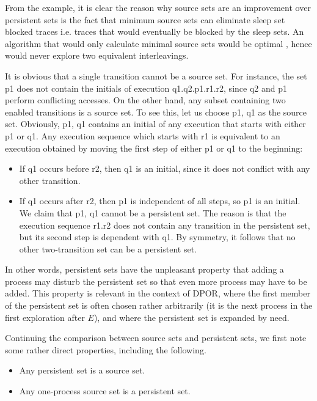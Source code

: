 From the example, it is clear the reason why source sets are an improvement over persistent sets is the fact that minimum source sets can eliminate
sleep set blocked traces i.e. traces that would eventually be blocked by the sleep sets. An algorithm that would only calculate minimal source sets would be optimal \cite{AbdullaAronisJohnssonSagonasDPOR2014}, hence
would never explore two equivalent interleavings.

It is obvious that a single transition cannot be a source set. For
instance, the set {p1} does not contain the initials of execution q1.q2.p1.r1.r2,
since q2 and p1 perform conflicting accesses. On the other hand, any subset
containing two enabled transitions is a source set. To see this, let us choose
{p1, q1} as the source set. Obviously, {p1, q1} contains an initial of any execution
that starts with either p1 or q1. Any execution sequence which starts with r1 is
equivalent to an execution obtained by moving the first step of either p1 or q1 to
the beginning:
\begin{itemize}
\item If q1 occurs before r2, then q1 is an initial, since it does not conflict with
any other transition.
\item If q1 occurs after r2, then p1 is independent of all steps, so p1 is an initial.
We claim that {p1, q1} cannot be a persistent set. The reason is that the execution
sequence r1.r2 does not contain any transition in the persistent set, but its second
step is dependent with q1. By symmetry, it follows that no other two-transition
set can be a persistent set.
\end{itemize}

In other words, persistent sets have the unpleasant property that adding a process
may disturb the persistent set so that even more process may have to be added.
This property is relevant in the context of DPOR, where the first member of the
persistent set is often chosen rather arbitrarily (it is the next process in the first
exploration after $E$), and where the persistent set is expanded by need.

Continuing the comparison between source sets and persistent sets, we first
note some rather direct properties, including the following.

\begin{itemize}
\item Any persistent set is a source set.
\item Any one-process source set is a persistent set.
\end{itemize}

